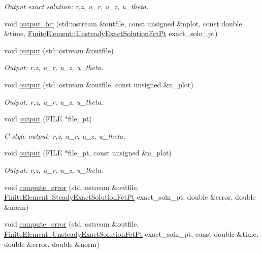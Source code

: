 \begin{DoxyCompactItemize}
\begin{DoxyCompactList}\small\item\em Output exact solution\+: r,z, u\+\_\+r, u\+\_\+z, u\+\_\+theta. \end{DoxyCompactList}\item 
void \hyperlink{classoomph_1_1AxisymmetricLinearElasticityEquations_aab25e54e0e6b64c7f758d815884329e4}{output\+\_\+fct} (std\+::ostream \&outfile, const unsigned \&nplot, const double \&time, \hyperlink{classoomph_1_1FiniteElement_ad4ecf2b61b158a4b4d351a60d23c633e}{Finite\+Element\+::\+Unsteady\+Exact\+Solution\+Fct\+Pt} exact\+\_\+soln\+\_\+pt)
\item 
void \hyperlink{classoomph_1_1AxisymmetricLinearElasticityEquations_a798627057a8d79bccc17d277e1717f67}{output} (std\+::ostream \&outfile)
\begin{DoxyCompactList}\small\item\em Output\+: r,z, u\+\_\+r, u\+\_\+z, u\+\_\+theta. \end{DoxyCompactList}\item 
void \hyperlink{classoomph_1_1AxisymmetricLinearElasticityEquations_a55d90a70997efe0a5cf34e269e0cf6b8}{output} (std\+::ostream \&outfile, const unsigned \&n\+\_\+plot)
\begin{DoxyCompactList}\small\item\em Output\+: r,z, u\+\_\+r, u\+\_\+z, u\+\_\+theta. \end{DoxyCompactList}\item 
void \hyperlink{classoomph_1_1AxisymmetricLinearElasticityEquations_a8a96657fee4dd85fdbbf25d0855c27f2}{output} (F\+I\+LE $\ast$file\+\_\+pt)
\begin{DoxyCompactList}\small\item\em C-\/style output\+: r,z, u\+\_\+r, u\+\_\+z, u\+\_\+theta. \end{DoxyCompactList}\item 
void \hyperlink{classoomph_1_1AxisymmetricLinearElasticityEquations_ae706158f52c6251de990b640787e608b}{output} (F\+I\+LE $\ast$file\+\_\+pt, const unsigned \&n\+\_\+plot)
\begin{DoxyCompactList}\small\item\em Output\+: r,z, u\+\_\+r, u\+\_\+z, u\+\_\+theta. \end{DoxyCompactList}\item 
void \hyperlink{classoomph_1_1AxisymmetricLinearElasticityEquations_ac8d00d39dc3bbfe9125fffe3f498982b}{compute\+\_\+error} (std\+::ostream \&outfile, \hyperlink{classoomph_1_1FiniteElement_a690fd33af26cc3e84f39bba6d5a85202}{Finite\+Element\+::\+Steady\+Exact\+Solution\+Fct\+Pt} exact\+\_\+soln\+\_\+pt, double \&error, double \&norm)
\item 
void \hyperlink{classoomph_1_1AxisymmetricLinearElasticityEquations_ad6a1568c8d02d11a25c4b19c9f6763a2}{compute\+\_\+error} (std\+::ostream \&outfile, \hyperlink{classoomph_1_1FiniteElement_ad4ecf2b61b158a4b4d351a60d23c633e}{Finite\+Element\+::\+Unsteady\+Exact\+Solution\+Fct\+Pt} exact\+\_\+soln\+\_\+pt, const double \&time, double \&error, double \&norm)
\end{DoxyCompactItemize}
